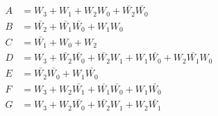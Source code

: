 \documentclass[12pt]{article}
\begin{document}
\begin{align*}
    A &=W_3+W_1+W_2W_0+\bar{W_2}\bar{W_0} \\
    B &=\bar{W_2}+\bar{W_1}\bar{W_0}+W_1W_0 \\
    C &=\bar{W_1}+W_0+W_2 \\
    D &=W_3+\bar{W_2}\bar{W_0}+\bar{W_2}W_1+W_1\bar{W_0}+W_2\bar{W_1}W_0\\
    E &=\bar{W_2}\bar{W_0}+W_1\bar{W_0} \\
    F &=W_3+W_2\bar{W_1}+\bar{W_1}\bar{W_0}+W_1\bar{W_0} \\
    G &=W_3+W_2\bar{W_0}+\bar{W_2}W_1+W_2\bar{W_1} \\
\end{align*}
\end{document}
